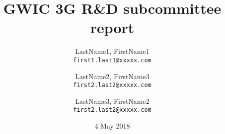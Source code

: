 \documentclass[url,11pt]{article}
\def\biblio{}
\begin{document}
\dosecttoc

\def\biblio{} %
\togglefalse{standalone}


\title{GWIC 3G R\&D subcommittee report }

\author{
  LastName1, FirstName1\\
  \texttt{first1.last1@xxxxx.com}
  \and
  LastName2, FirstName3\\
  \texttt{first2.last2@xxxxx.com}
  \and
  LastName3, FirstName2\\
  \texttt{first2.last2@xxxxx.com}
}

\date{4 May 2018}
\maketitle
\tableofcontents
\pagebreak



\newpage


\newpage


\newpage


\newpage


\newpage

\newpage

\newpage

\newpage

\newpage


\newpage

\newpage

\newpage

\newpage

\newpage
\newpage
{}



\newpage
{}
\appendix


%
%
\end{document}
